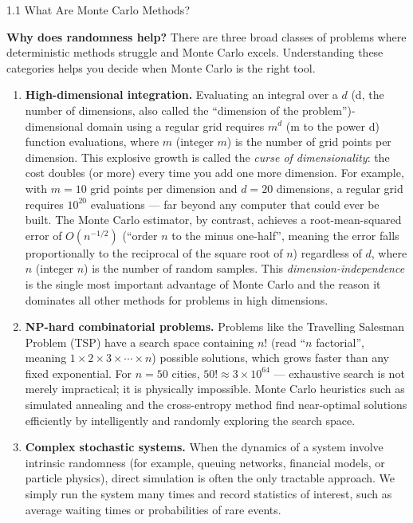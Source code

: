 \documentclass[aspectratio=169,10pt]{beamer}
\begin{document}
\begin{frame}[allowframebreaks]{1.1 What Are Monte Carlo Methods?}
  \framebreak

  \textbf{Why does randomness help?}  There are three broad classes of problems
  where deterministic methods struggle and Monte Carlo excels.  Understanding
  these categories helps you decide when Monte Carlo is the right tool.

  \begin{enumerate}
    \item \textbf{High-dimensional integration.}  Evaluating an integral over a
      $d$ (d, the number of dimensions, also called the ``dimension of the
      problem'')-dimensional domain using a regular grid requires $m^d$ (m to
      the power d) function evaluations, where $m$ (integer $m$) is the number
      of grid points per dimension.  This explosive growth is called the
      \emph{curse of dimensionality}: the cost doubles (or more) every time you
      add one more dimension.  For example, with $m = 10$ grid points per
      dimension and $d = 20$ dimensions, a regular grid requires $10^{20}$
      evaluations --- far beyond any computer that could ever be built.  The
      Monte Carlo estimator, by contrast, achieves a root-mean-squared error of
      $O(n^{-1/2})$ (``order $n$ to the minus one-half'', meaning the error
      falls proportionally to the reciprocal of the square root of $n$)
      regardless of $d$, where $n$ (integer $n$) is the number of random
      samples.  This \emph{dimension-independence} is the single most important
      advantage of Monte Carlo and the reason it dominates all other methods for
      problems in high dimensions.

    \item \textbf{NP-hard combinatorial problems.}  Problems like the Travelling
      Salesman Problem (TSP) have a search space containing $n!$ (read
      ``$n$ factorial'', meaning $1 \times 2 \times 3 \times \cdots \times n$)
      possible solutions, which grows faster than any fixed exponential.  For
      $n = 50$ cities, $50! \approx 3 \times 10^{64}$ --- exhaustive search is
      not merely impractical; it is physically impossible.  Monte Carlo
      heuristics such as simulated annealing and the cross-entropy method find
      near-optimal solutions efficiently by intelligently and randomly exploring
      the search space.

    \item \textbf{Complex stochastic systems.}  When the dynamics of a system
      involve intrinsic randomness (for example, queuing networks, financial
      models, or particle physics), direct simulation is often the only
      tractable approach.  We simply run the system many times and record
      statistics of interest, such as average waiting times or probabilities
      of rare events.
  \end{enumerate}


\end{frame}
\end{document}
